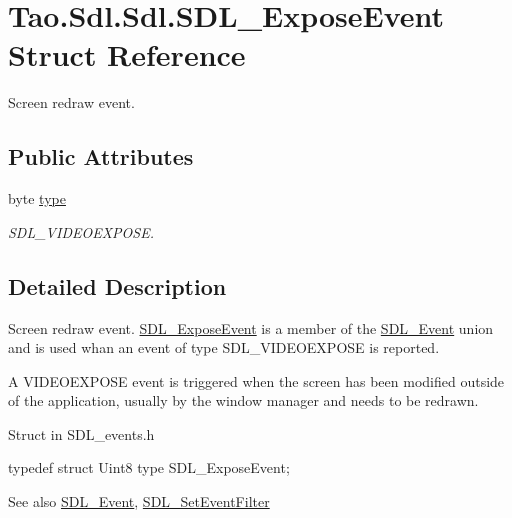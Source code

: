 \hypertarget{struct_tao_1_1_sdl_1_1_sdl_1_1_s_d_l___expose_event}{
\section{Tao.Sdl.Sdl.SDL\_\-ExposeEvent Struct Reference}
\label{struct_tao_1_1_sdl_1_1_sdl_1_1_s_d_l___expose_event}
}


Screen redraw event.  


\subsection*{Public Attributes}
\begin{DoxyCompactItemize}
\item 
byte \hyperlink{struct_tao_1_1_sdl_1_1_sdl_1_1_s_d_l___expose_event_a35b4d97e4271af3c11acb392975cda25}{type}
\begin{DoxyCompactList}\small\item\em SDL\_\-VIDEOEXPOSE. \item\end{DoxyCompactList}\end{DoxyCompactItemize}


\subsection{Detailed Description}
Screen redraw event. \hyperlink{struct_tao_1_1_sdl_1_1_sdl_1_1_s_d_l___expose_event}{SDL\_\-ExposeEvent} is a member of the \hyperlink{struct_tao_1_1_sdl_1_1_s_d_l___event}{SDL\_\-Event} union and is used whan an event of type SDL\_\-VIDEOEXPOSE is reported. 

A VIDEOEXPOSE event is triggered when the screen has been modified outside of the application, usually by the window manager and needs to be redrawn. 

Struct in SDL\_\-events.h 
\begin{DoxyCode}
            typedef struct{
                        Uint8 type
                        } SDL_ExposeEvent;
\end{DoxyCode}
 

\begin{DoxySeeAlso}{See also}
\hyperlink{struct_tao_1_1_sdl_1_1_s_d_l___event}{SDL\_\-Event}, \hyperlink{_sdl_8cs_afd1ab8f1891d71ad6544323050271d2d}{SDL\_\-SetEventFilter}


\end{DoxySeeAlso}


